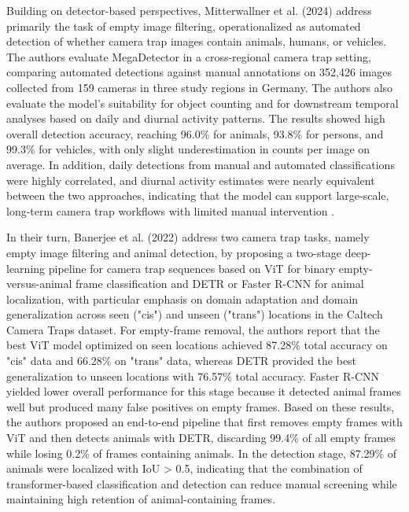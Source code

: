 Building on detector-based perspectives, Mitterwallner et al. (2024) \cite{mitterwallner2024automated} address primarily the task of empty image filtering, operationalized as automated detection of whether camera trap images contain animals, humans, or vehicles. The authors evaluate MegaDetector in a cross-regional camera trap setting, comparing automated detections against manual annotations on 352,426 images collected from 159 cameras in three study regions in Germany. The authors also evaluate the model's suitability for object counting and for downstream temporal analyses based on daily and diurnal activity patterns. The results showed high overall detection accuracy, reaching 96.0\% for animals, 93.8\% for persons, and 99.3\% for vehicles, with only slight underestimation in counts per image on average. In addition, daily detections from manual and automated classifications were highly correlated, and diurnal activity estimates were nearly equivalent between the two approaches, indicating that the model can support large-scale, long-term camera trap workflows with limited manual intervention \cite{mitterwallner2024automated}.

In their turn, Banerjee et al. (2022) \cite{banerjee2022sieving} address two camera trap tasks, namely empty image filtering and animal detection, by proposing a two-stage deep-learning pipeline for camera trap sequences based on ViT for binary empty-versus-animal frame classification and DETR or Faster R-CNN for animal localization, with particular emphasis on domain adaptation and domain generalization across seen ("cis") and unseen ("trans") locations in the Caltech Camera Traps dataset. For empty-frame removal, the authors report that the best ViT model optimized on seen locations achieved 87.28\% total accuracy on "cis" data and 66.28\% on "trans" data, whereas DETR provided the best generalization to unseen locations with 76.57\% total accuracy.  Faster R-CNN yielded lower overall performance for this stage because it detected animal frames well but produced many false positives on empty frames. Based on these results, the authors proposed an end-to-end pipeline that first removes empty frames with ViT and then detects animals with DETR, discarding 99.4\% of all empty frames while losing 0.2\% of frames containing animals. In the detection stage, 87.29\% of animals were localized with IoU > 0.5, indicating that the combination of transformer-based classification and detection can reduce manual screening while maintaining high retention of animal-containing frames.

